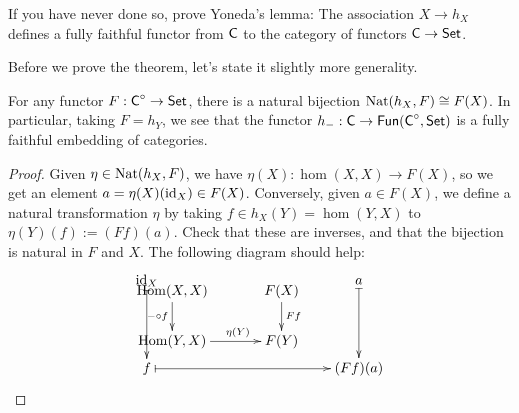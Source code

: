  
\begin{exercise}[1.1]
 If you have never done so, prove Yoneda's lemma: The association $X\to h_X$ defines a fully faithful functor from $\text{\sf C}$ to the category of functors $\text{\sf C}\to \text{\sf Set}$.
\end{exercise}
\begin{solution}
 Before we prove the theorem, let's state it slightly more generality.
 \begin{theorem*}
  For any functor $F:\text{\sf C}^\circ\to \text{\sf Set}$, there is a natural bijection ${\rm Nat}(h_X,F)\cong F(X)$. In particular, taking $F=h_Y$, we see that the functor $h_{-}:\text{\sf C}\to \operatorname{\sf Fun}(\text{\sf C}^\circ,\text{\sf Set})$ is a fully faithful embedding of categories.
 \end{theorem*}
 \begin{proof}
  Given $\eta\in \operatorname{Nat}(h_X,F)$, we have $\eta(X):\hom(X,X)\to F(X)$, so we get an element $a=\eta(X)(\operatorname{id}_X)\in F(X)$. Conversely, given $a\in F(X)$, we define a natural transformation $\eta$ by taking $f\in h_X(Y)=\hom(Y,X)$ to $\eta(Y)(f):=(Ff)(a)$. Check that these are inverses, and that the bijection is natural in $F$ and $X$. The following diagram should help:
  \[\raisebox{5.5pc}{$\xymatrix @C=10pc @R=4pc{
  \id_X \ar@{|->}[d] \ar@{}[dr]|(0.06){
     \xymatrix @!0 @R=3pc @C=6.5pc{
     \hom(X,X)\ar[d]_{- \circ f} & F(X) \ar[d]^{Ff}\\
     \hom(Y,X) \ar[r]^(.6){\eta(Y)} & F(Y)}
  } & a\ar@{|->}[d]\\
  f \ar@{|->}[r] & (Ff)(a)
  }$}\qedhere\]
 \end{proof}
\end{solution}

